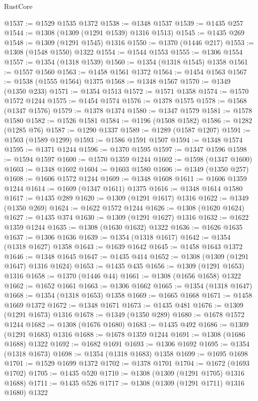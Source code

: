 \begin{lexlean}{RustCore}
\begin{coremodule}
@1537 := @1529 @1535 @1372
@1538 := @1348 @1537
@1539 := @1435 @257
@1544 := @1308 (@1309 (@1291 @1539) @1316 @1513)
@1545 := @1435 @269
@1548 := @1309 (@1291 @1545) @1316
@1550 := @1370 (@1446 @217)
@1553 := @1308 (@1548 @1550) @1322
@1554 := @1544 @1553
@1555 := @1306 @1554
@1557 := @1354 (@1318 @1539)
@1560 := @1354 (@1318 @1545) @1358
@1561 := @1557 @1560
@1563 := @1458 @1561 @1372
@1564 := @1454 @1563
@1567 := @1538 (@1555 @1564) @1375
@1568 := @1348 @1567
@1570 := @1349 (@1350 @233)
@1571 := @1354 @1513
@1572 := @1571 @1358
@1574 := @1570 @1572 @1244
@1575 := @1454 @1574
@1576 := @1378 @1575
@1578 := @1568 (@1347 @1576)
@1579 := @1378 @1374
@1580 := @1347 @1579
@1581 := @1578 @1580
@1582 := @1526 @1581
@1584 := @1196 (@1508 @1582)
@1586 := @1282 (@1285 @76)
@1587 := @1290 @1337
@1589 := @1289 (@1587 @1207)
@1591 := @1503 (@1589 @1299)
@1593 := @1586 @1591 @1507
@1594 := @1348 @1574
@1595 := @1371 @1244
@1596 := @1370 @1595
@1597 := @1347 @1596
@1598 := @1594 @1597
@1600 := @1570 @1359 @1244
@1602 := @1598 (@1347 @1600)
@1603 := @1348 @1602
@1604 := @1603 @1580
@1606 := @1349 (@1350 @257)
@1608 := @1606 @1572 @1244
@1609 := @1348 @1608
@1611 := @1606 @1359 @1244
@1614 := @1609 (@1347 @1611) @1375
@1616 := @1348 @1614 @1580
@1617 := @1435 @289
@1620 := @1309 (@1291 @1617) @1316
@1622 := @1349 (@1350 @269)
@1624 := @1622 @1572 @1244
@1626 := @1308 (@1620 @1624)
@1627 := @1435 @374
@1630 := @1309 (@1291 @1627) @1316
@1632 := @1622 @1359 @1244
@1635 := @1308 (@1630 @1632) @1322
@1636 := @1626 @1635
@1637 := @1306 @1636
@1639 := @1354 (@1318 @1617)
@1642 := @1354 (@1318 @1627) @1358
@1643 := @1639 @1642
@1645 := @1458 @1643 @1372
@1646 := @1348 @1645
@1647 := @1435 @414
@1652 := @1308 (@1309 (@1291 @1647) @1316 @1624)
@1653 := @1435 @435
@1656 := @1309 (@1291 @1653) @1316
@1658 := @1370 (@1446 @44)
@1661 := @1308 (@1656 @1658) @1322
@1662 := @1652 @1661
@1663 := @1306 @1662
@1665 := @1354 (@1318 @1647)
@1668 := @1354 (@1318 @1653) @1358
@1669 := @1665 @1668
@1671 := @1458 @1669 @1372
@1672 := @1348 @1671
@1673 := @1435 @481
@1676 := @1309 (@1291 @1673) @1316
@1678 := @1349 (@1350 @289)
@1680 := @1678 @1572 @1244
@1682 := @1308 (@1676 @1680)
@1683 := @1435 @492
@1686 := @1309 (@1291 @1683) @1316
@1688 := @1678 @1359 @1244
@1691 := @1308 (@1686 @1688) @1322
@1692 := @1682 @1691
@1693 := @1306 @1692
@1695 := @1354 (@1318 @1673)
@1698 := @1354 (@1318 @1683) @1358
@1699 := @1695 @1698
@1701 := @1529 @1699 @1372
@1702 := @1378 @1701
@1704 := @1672 (@1693 @1702)
@1705 := @1435 @520
@1710 := @1308 (@1309 (@1291 @1705) @1316 @1688)
@1711 := @1435 @526
@1717 := @1308 (@1309 (@1291 @1711) @1316 @1680) @1322

\end{coremodule}
\end{lexlean}
